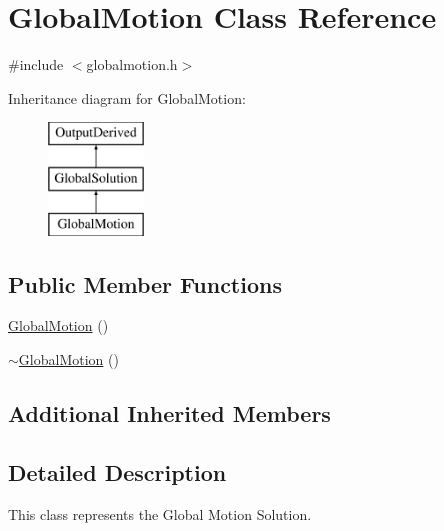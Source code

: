 \hypertarget{class_global_motion}{\section{Global\-Motion Class Reference}
\label{class_global_motion}
}


{\ttfamily \#include $<$globalmotion.\-h$>$}

Inheritance diagram for Global\-Motion\-:\begin{figure}[H]
\begin{center}
\leavevmode
\includegraphics[height=3.000000cm]{class_global_motion}
\end{center}
\end{figure}
\subsection*{Public Member Functions}
\begin{DoxyCompactItemize}
\item 
\hyperlink{class_global_motion_afe0b801895608782addf27d231bce572}{Global\-Motion} ()
\item 
\hyperlink{class_global_motion_aee21eade3de9cb666a6b8fa42cf1e9e1}{$\sim$\-Global\-Motion} ()
\end{DoxyCompactItemize}
\subsection*{Additional Inherited Members}


\subsection{Detailed Description}
This class represents the Global Motion Solution. 

